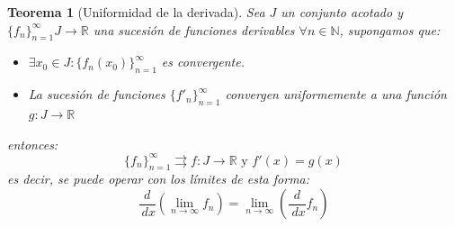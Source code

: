 \documentclass[10pt,a4paper,openright]{book}
\theoremstyle{break}
\newtheorem{theo}{Teorema}[chapter]
\newcommand{\dif}[1]{\ d#1}
\begin{document}
\begin{theo}[Uniformidad de la derivada]
Sea $J$ un conjunto acotado y $\{f_n\}_{n=1}^\infty J \rightarrow \mathbb{R}$ una sucesión de funciones derivables $\forall n \in \mathbb{N}$, supongamos que:
\begin{itemize}
\item $\exists x_0 \in J : \{f_n (x_0)\}_{n = 1}^\infty$ es convergente.

\item La sucesión de funciones $\{f'_n \}_{n = 1}^\infty$ convergen uniformemente a una función $g : J \to \mathbb{R}$
\end{itemize}
entonces:
$$\{f_n\}_{n=1}^\infty \rightrightarrows f: J \to \mathbb{R} \mbox{ y } f'(x) = g(x)$$
es decir, se puede operar con los límites de esta forma:
$$\frac{d}{\dif{x}} \left(\lim_{n \rightarrow \infty} f_n\right) = \lim_{n \rightarrow \infty} \left( \frac{d}{\dif{x}} f_n \right)$$
\end{theo}
\end{document}
